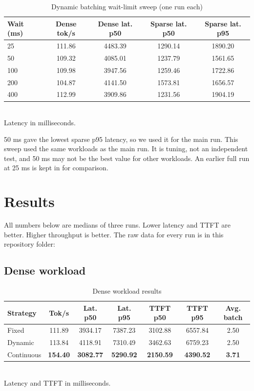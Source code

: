 \documentclass[12pt,a4paper]{article}
\begin{document}
\begin{table}[H]
\centering
\caption{Dynamic batching wait-limit sweep (one run each)}
\label{tab:sweep}
\small
\begin{tabular}{lcccc}
\toprule
\textbf{Wait (ms)} & \textbf{Dense tok/s} & \textbf{Dense lat. p50} & \textbf{Sparse lat. p50} & \textbf{Sparse lat. p95} \\
\midrule
25 & 111.86 & 4483.39 & 1290.14 & 1890.20 \\
50 & 109.32 & 4085.01 & 1237.79 & 1561.65 \\
100 & 109.98 & 3947.56 & 1259.46 & 1722.86 \\
200 & 104.87 & 4141.50 & 1573.81 & 1656.57 \\
400 & 112.99 & 3909.86 & 1231.56 & 1904.19 \\
\bottomrule
\end{tabular}
\\[2pt]
{\small Latency in milliseconds.}
\end{table}

50 ms gave the lowest sparse p95 latency, so we used it for the main run. This sweep used the same workloads as the main run. It is tuning, not an independent test, and 50 ms may not be the best value for other workloads. An earlier full run at 25 ms is kept in  for comparison.

\section{Results}
All numbers below are medians of three runs. Lower latency and TTFT are better. Higher throughput is better. The raw data for every run is in this repository folder:
\begin{center}
\end{center}

\subsection{Dense workload}

\begin{table}[H]
\centering
\caption{Dense workload results}
\label{tab:dense}
\small
\setlength{\tabcolsep}{4pt}
\begin{tabular}{lcccccc}
\toprule
\textbf{Strategy} & \textbf{Tok/s} & \textbf{Lat. p50} & \textbf{Lat. p95} & \textbf{TTFT p50} & \textbf{TTFT p95} & \textbf{Avg. batch} \\
\midrule
Fixed & 111.89 & 3934.17 & 7387.23 & 3102.88 & 6557.84 & 2.50 \\
Dynamic & 113.84 & 4118.91 & 7310.49 & 3462.63 & 6759.23 & 2.50 \\
Continuous & \textbf{154.40} & \textbf{3082.77} & \textbf{5290.92} & \textbf{2150.59} & \textbf{4390.52} & \textbf{3.71} \\
\bottomrule
\end{tabular}
\\[2pt]
{\small Latency and TTFT in milliseconds.}
\end{table}
\end{document}
